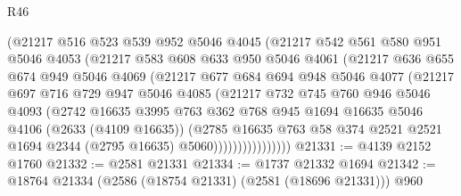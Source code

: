 \begin{lexlean}{R46}
\begin{coremodule}
                  (@21217
                    @516
                    @523
                    @539
                    @952
                    @5046
                    @4045
                    (@21217
                      @542
                      @561
                      @580
                      @951
                      @5046
                      @4053
                      (@21217
                        @583
                        @608
                        @633
                        @950
                        @5046
                        @4061
                        (@21217
                          @636
                          @655
                          @674
                          @949
                          @5046
                          @4069
                          (@21217
                            @677
                            @684
                            @694
                            @948
                            @5046
                            @4077
                            (@21217
                              @697
                              @716
                              @729
                              @947
                              @5046
                              @4085
                              (@21217
                                @732
                                @745
                                @760
                                @946
                                @5046
                                @4093
                                (@2742
                                  @16635
                                  @3995
                                  @763
                                  @362
                                  @768
                                  @945
                                  @1694
                                  @16635
                                  @5046
                                  @4106
                                  (@2633 (@4109 @16635))
                                  (@2785
                                    @16635
                                    @763
                                    @58
                                    @374
                                    @2521
                                    @2521
                                    @1694
                                    @2344
                                    (@2795 @16635)
                                    @5060))))))))))))))))
@21331 := @4139 @2152 @1760
@21332 := @2581 @21331
@21334 := @1737 @21332 @1694
@21342 := @18764 @21334 (@2586 (@18754 @21331) (@2581 (@18696 @21331))) @960

\end{coremodule}
\end{lexlean}
